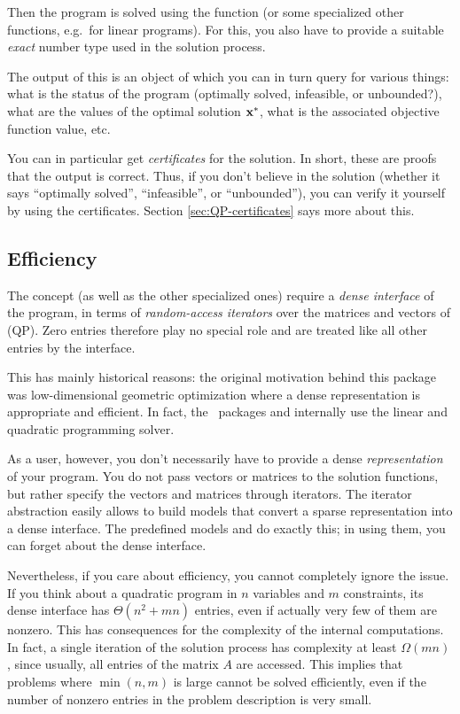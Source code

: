 Then the program is solved using the function 
(or some specialized other functions, e.g.\ for linear programs). For this,
you also have to provide a suitable \emph{exact} number type  used
in the solution process.

The output of this is an object of 
which you can in turn query for various things: what is the status of 
the program (optimally solved, infeasible, or unbounded?), what are 
the values of the optimal solution $\mathbf{x}^*$, what is the associated
objective function value, etc. 

You can in particular get \emph{certificates} for the solution. In short,
these are proofs that the output is correct. Thus, if you don't believe 
in the solution (whether it says ``optimally solved'', ``infeasible'', 
or ``unbounded''), you can verify it yourself by using the certificates.
Section \ref{sec:QP-certificates} says more about this.

\subsection{Efficiency}
The concept  (as well as the
other specialized ones) require a \emph{dense interface} 
of the program, in terms of \emph{random-access iterators} over 
the matrices and vectors of (QP). Zero entries therefore play no
special role and are treated like all other entries by the
interface.  

This has mainly historical
reasons: the original motivation behind this package was 
low-dimensional geometric optimization where 
a dense representation is appropriate and efficient. In fact, 
the \cgal\ packages  and
 internally use the linear 
and quadratic programming solver. 

As a user, however, you don't necessarily have to provide a dense
\emph{representation} of your program. You do not pass vectors or
matrices to the solution functions, but rather specify the vectors 
and matrices through iterators. The iterator abstraction 
easily allows to build models that convert a sparse representation 
into a dense interface. The predefined models  
and  do exactly this; in using them, 
you can forget about the dense interface.  

Nevertheless, if you care about efficiency, you cannot completely 
ignore the issue. If
you think about a quadratic program in $n$ variables and $m$
constraints, its dense interface has $\Theta(n^2 + mn)$ entries,
even if actually very few of them are nonzero. This has consequences 
for the complexity of the internal computations. In fact, a single
iteration of the solution process has complexity at least 
$\Omega(mn)$, since usually, all entries of the matrix $A$ are accessed. 
This implies that problems where $\min(n,m)$ is large cannot be solved
efficiently, even if the number of nonzero entries in the problem
description is very small.

